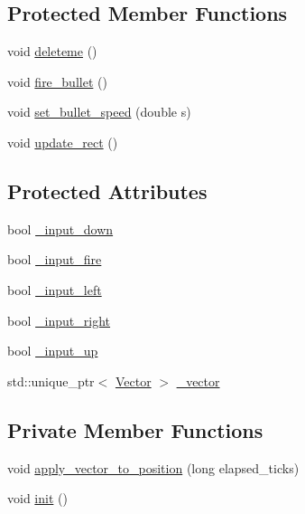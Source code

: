 \subsection*{Protected Member Functions}
\begin{DoxyCompactItemize}
\item 
void \hyperlink{classAsteroids_1_1Domain_1_1Game_1_1Actors_1_1Actor_afb9985ff7dea1fe2d21b365a7aec8a45}{deleteme} ()
\item 
void \hyperlink{classAsteroids_1_1Domain_1_1Game_1_1Actors_1_1Actor_ad108a838180454ac98facde4518d7660}{fire\+\_\+bullet} ()
\item 
void \hyperlink{classAsteroids_1_1Domain_1_1Game_1_1Actors_1_1Actor_a4dddef94a025aca35e8592aa3aac71e5}{set\+\_\+bullet\+\_\+speed} (double s)
\item 
void \hyperlink{classAsteroids_1_1Domain_1_1Game_1_1Actors_1_1Actor_a4bb89af7457ff402fa5a4a11d62ab4ca}{update\+\_\+rect} ()
\end{DoxyCompactItemize}
\subsection*{Protected Attributes}
\begin{DoxyCompactItemize}
\item 
bool \hyperlink{classAsteroids_1_1Domain_1_1Game_1_1Actors_1_1Actor_aa2be04cf8687bc74f15b89248f9c2e56}{\+\_\+input\+\_\+down}
\item 
bool \hyperlink{classAsteroids_1_1Domain_1_1Game_1_1Actors_1_1Actor_aaedd486877baf758e50b0a66d7ff5bae}{\+\_\+input\+\_\+fire}
\item 
bool \hyperlink{classAsteroids_1_1Domain_1_1Game_1_1Actors_1_1Actor_a78fd14ae6c96decf7a436bf3d1d1c2e6}{\+\_\+input\+\_\+left}
\item 
bool \hyperlink{classAsteroids_1_1Domain_1_1Game_1_1Actors_1_1Actor_a5a46a7388219880f2214a57e5be471a0}{\+\_\+input\+\_\+right}
\item 
bool \hyperlink{classAsteroids_1_1Domain_1_1Game_1_1Actors_1_1Actor_aad7442429183c831e311a5bae87c8d2a}{\+\_\+input\+\_\+up}
\item 
std\+::unique\+\_\+ptr$<$ \hyperlink{classAsteroids_1_1Domain_1_1Game_1_1Actors_1_1Vector}{Vector} $>$ \hyperlink{classAsteroids_1_1Domain_1_1Game_1_1Actors_1_1Actor_af0ff2d78ca6c93a1cc482e9ddb780c00}{\+\_\+vector}
\end{DoxyCompactItemize}
\subsection*{Private Member Functions}
\begin{DoxyCompactItemize}
\item 
void \hyperlink{classAsteroids_1_1Domain_1_1Game_1_1Actors_1_1Actor_aafec1372aa2f5b203112aae5f6b16310}{apply\+\_\+vector\+\_\+to\+\_\+position} (long elapsed\+\_\+ticks)
\item 
void \hyperlink{classAsteroids_1_1Domain_1_1Game_1_1Actors_1_1Actor_a5f59fc92345120fdc67675ec0884b137}{init} ()
\end{DoxyCompactItemize}
